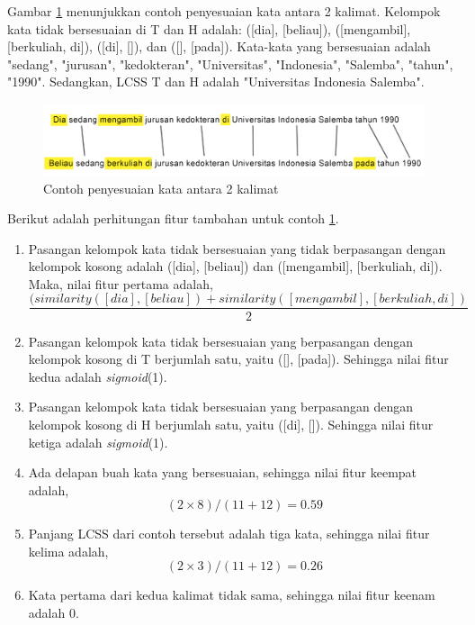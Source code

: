 	Gambar \ref{fig:fitur_tambahan} menunjukkan contoh penyesuaian kata antara 2 kalimat. Kelompok kata tidak bersesuaian di T dan H adalah: ([dia], [beliau]), ([mengambil], [berkuliah, di]), ([di], []), dan  ([], [pada]). Kata-kata yang bersesuaian adalah "sedang", "jurusan", "kedokteran", "Universitas", "Indonesia", "Salemba", "tahun", "1990". Sedangkan, LCSS T dan H adalah "Universitas Indonesia Salemba". 
	\begin{figure}
		\centering
		\includegraphics[width=0.9\linewidth]{pics/fitur_tambahan}
		\caption{Contoh penyesuaian kata antara 2 kalimat}
		\label{fig:fitur_tambahan}
	\end{figure}
	Berikut adalah perhitungan fitur tambahan untuk contoh \ref{fig:fitur_tambahan}.
	\begin{enumerate}
		\item Pasangan kelompok kata tidak bersesuaian yang tidak berpasangan dengan kelompok kosong adalah ([dia], [beliau]) dan ([mengambil], [berkuliah, di]). Maka, nilai fitur pertama adalah,
		\begin{equation}
		\frac{(similarity([dia], [beliau]) + similarity([mengambil], [berkuliah, di])}{2}
		\end{equation}
		\item Pasangan kelompok kata tidak bersesuaian yang berpasangan dengan kelompok kosong di T berjumlah satu, yaitu ([], [pada]). Sehingga nilai fitur kedua adalah \textit{sigmoid}(1).
		\item Pasangan kelompok kata tidak bersesuaian yang berpasangan dengan kelompok kosong di H berjumlah satu, yaitu ([di], []). Sehingga nilai fitur ketiga adalah \textit{sigmoid}(1).
		\item Ada delapan buah kata yang bersesuaian, sehingga nilai fitur keempat adalah,
		\begin{equation}
		(2 \times 8)/(11 + 12) = 0.59
		\end{equation}		
		\item Panjang LCSS dari contoh tersebut adalah tiga kata, sehingga nilai fitur kelima adalah,
		\begin{equation}
		(2 \times 3)/(11 + 12) = 0.26
		\end{equation}
		\item Kata pertama dari kedua kalimat tidak sama, sehingga nilai fitur keenam adalah 0.
	\end{enumerate}

